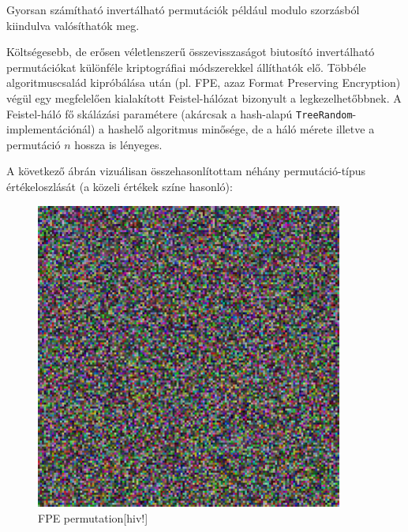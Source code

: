 \documentclass[
    parspace,
    noindent,
    nohyp,
]{elteiktdk}[2023/04/10]
\begin{document}
Gyorsan számítható invertálható permutációk például modulo szorzásból kiindulva valósíthatók meg.

Költségesebb, de erősen véletlenszerű összevisszaságot biutosító invertálható permutációkat
különféle kriptográfiai módszerekkel állíthatók elő.
Többéle algoritmuscsalád kipróbálása után (pl. FPE, azaz Format Preserving Encryption) végül
egy megfelelően kialakított Feistel-hálózat bizonyult a legkezelhetőbbnek.
A Feistel-háló fő skálázási paramétere (akárcsak a hash-alapú \texttt{TreeRandom}-implementációnál)
a hashelő algoritmus minősége,
de a háló mérete illetve a permutáció $n$ hossza is lényeges.

A következő ábrán vizuálisan összehasonlítottam néhány permutáció-típus értékeloszlását
(a közeli értékek színe hasonló):

\begin{figure}[H]
  \centering
  \hspace*{\fill}
  \begin{minipage}[b]{0.45\textwidth}
    \centering
    \includegraphics[width=0.9\textwidth]{image/permutation-fpe1.png}
    \caption{FPE permutation[hiv!]}
  \end{minipage}
  \hspace*{\fill}
  \begin{minipage}[b]{0.45\textwidth}
    \centering

\end{minipage}
\end{figure}
\end{document}

